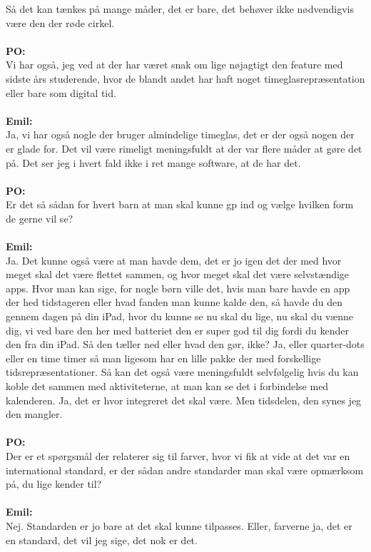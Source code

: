 Så det kan tænkes på mange måder, det er bare, det behøver ikke nødvendigvis være den der røde cirkel.
\\\\
\textbf{PO:}\\
Vi har også, jeg ved at der har været snak om lige nøjagtigt den feature med sidste års studerende, hvor de blandt andet har haft noget timeglasrepræsentation eller bare som digital tid.
\\\\
\textbf{Emil:}\\
Ja, vi har også nogle der bruger almindelige timeglas, det er der også nogen der er glade for.
Det vil være rimeligt meningsfuldt at der var flere måder at gøre det på.
Det ser jeg i hvert fald ikke i ret mange software, at de har det. 
\\\\
\textbf{PO:}\\
Er det så sådan for hvert barn at man skal kunne gp ind og vælge hvilken form de gerne vil se?
\\\\
\textbf{Emil:}\\
Ja.
Det kunne også være at man havde dem, det er jo igen det der med hvor meget skal det være flettet sammen, og hvor meget skal det være selvstændige apps. 
Hvor man kan sige, for nogle børn ville det, hvis man bare havde en app der hed tidstageren eller hvad fanden man kunne kalde den, så havde du den gennem dagen på din iPad, hvor du kunne se nu skal du lige, nu skal du vænne dig, vi ved bare den her med batteriet den er super god til dig fordi du kender den fra din iPad.
Så den tæller ned eller hvad den gør, ikke?
Ja, eller quarter-dots eller en time timer så man ligesom har en lille pakke der med forskellige tidsrepræsentationer.  
Så kan det også være meningsfuldt selvfølgelig hvis du kan koble det sammen med aktiviteterne, at man kan se det i forbindelse med kalenderen. 
Ja, det er hvor integreret det skal være.   
Men tidsdelen, den synes jeg den mangler.
\\\\
\textbf{PO:}\\
Der er et spørgsmål der relaterer sig til farver, hvor vi fik at vide at det var en international standard, er der sådan andre standarder man skal være opmærksom på, du lige kender til?
\\\\
\textbf{Emil:} \\
Nej.
Standarden er jo bare at det skal kunne tilpasses. 
Eller, farverne ja, det er en standard, det vil jeg sige, det nok er det. 
